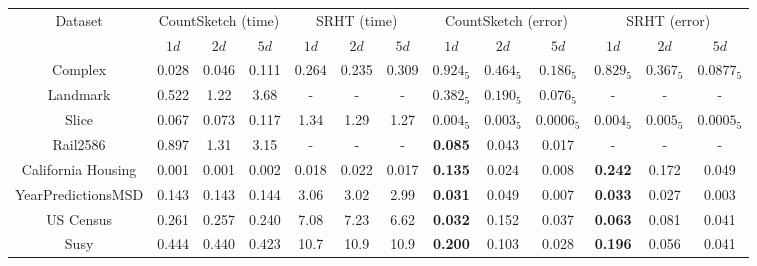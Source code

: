 %


\begin{table}[ht]
\centering
\begin{adjustbox}{width=1\textwidth}
\small

\begin{tabular}{|c|c|c|c|c|c|c|c|c|c|c|c|c|}
  \hline
\multirow{2}{*}{Dataset} & \multicolumn{3}{c|}{CountSketch (time)} & \multicolumn{3}{c}{SRHT (time)} & \multicolumn{3}{c|}{CountSketch (error)} & \multicolumn{3}{c|}{SRHT (error)} \\
                        &     $1d$       &  $2d$            & $5d$          & $1d$          & $2d$        & $5d$         &     $1d$       &  $2d$          &   $5d$         &  $1d$          & $2d$         & $5d$  \\
\hline

Complex & 0.028 & 0.046 & 0.111 & 0.264 & 0.235 & 0.309 & $0.924_5$ & $0.464_5$ & $0.186_5$ & $0.829_5$ & $ 0.367_5$ & $0.0877_5$ \\

Landmark & 0.522 & 1.22 & 3.68 & - & - & - & $0.382_5$ & $0.190_5$ & $0.076_5$ & - & - & - \\

Slice &  0.067  &  0.073  &  0.117 &   1.34   & 1.29 & 1.27 &  $0.004_5$  &  $0.003_5$ &  $0.0006_5$ &   $0.004_5$ & $0.005_5$  &  $0.0005_5$  \\

Rail2586  & 0.897 & 1.31 & 3.15 & - & - & - & \textbf{0.085} & 0.043 & 0.017 & - & - & - \\

California Housing     &   0.001          &  0.001           &   0.002          & 0.018         &  0.022        & 0.017          &   \textbf{0.135}          &  0.024           & 0.008       & \textbf{0.242}          & 0.172         & 0.049 \\


YearPredictionsMSD      &    0.143         &   0.143          &  0.144          &  3.06         &  3.02        &   2.99        &  \textbf{0.031}           &   0.049          &    0.007           &   \textbf{0.033}        &   0.027        &  0.003         \\

US Census   & 0.261 & 0.257 & 0.240 & 7.08 & 7.23 & 6.62 & \textbf{0.032} &  0.152 & 0.037 & \textbf{0.063} & 0.081 & 0.041 \\

Susy  & 0.444 & 0.440 & 0.423 & 10.7 & 10.9 & 10.9 & \textbf{0.200} & 0.103 & 0.028 & \textbf{0.196} & 0.056 & 0.041 \\


\end{tabular}
\end{adjustbox}
\end{table}
